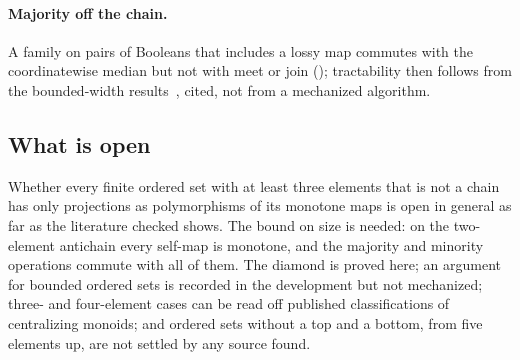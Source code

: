 \paragraph{Majority off the chain.} A family on pairs of Booleans that includes a lossy map commutes
with the coordinatewise median but not with meet or join (); tractability then
follows from the bounded-width results~\cite{jeavons1997,federvardi1998}, cited, not from a mechanized
algorithm.

\subsection{What is open}

Whether every finite ordered set with at least three elements that is not a chain has only
projections as polymorphisms of its monotone maps is open in general as far as the literature checked
shows. The bound on size is needed: on the two-element antichain every self-map is monotone, and the
majority and minority operations commute with all of them. The diamond is proved here;
an argument for bounded ordered sets is recorded in the development but not mechanized; three- and
four-element cases can be read off published classifications of centralizing monoids; and ordered
sets without a top and a bottom, from five elements up, are not settled by any source found.
